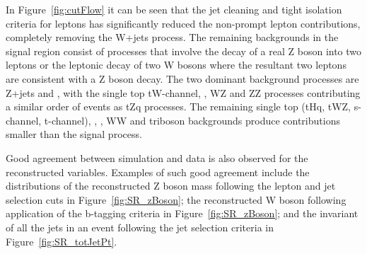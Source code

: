 In Figure~\ref{fig:cutFlow} it can be seen that the jet cleaning and tight isolation criteria for leptons has significantly reduced the non-prompt lepton contributions, completely removing the W+jets process.
The remaining backgrounds in the signal region consist of processes that involve the decay of a  real Z boson into two leptons or the leptonic decay of two W bosons where the resultant two leptons are consistent with a Z boson decay.
The two dominant background processes are Z+jets and \ttbar, with the single top tW-channel, \ttbarZ, WZ and ZZ processes contributing a similar order of events as tZq processes.
The remaining single top (tHq, tWZ, s-channel, t-channel), \ttbarW, \ttbarH, WW and triboson backgrounds produce contributions smaller than the signal process.

Good agreement between simulation and data is also observed for the reconstructed variables.
Examples of such good agreement include the distributions of the reconstructed Z boson mass following the lepton and jet selection cuts in Figure~\ref{fig:SR_zBoson}; the reconstructed W boson following application of the b-tagging criteria in Figure~\ref{fig:SR_zBoson}; and the invariant \pT of all the jets in an event following the jet selection criteria in Figure~\ref{fig:SR_totJetPt}.

